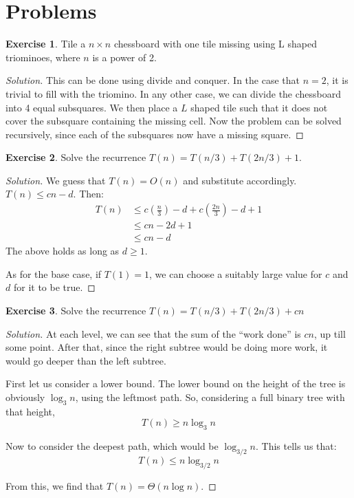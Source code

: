 \documentclass[12pt,letterpaper]{article}
\theoremstyle{definition}
\newtheorem*{exercise}{Exercise}
\newenvironment{solution}
  {\renewcommand\qedsymbol{$\blacksquare$}\begin{proof}[Solution]}
  {\end{proof}}
\begin{document}
\section{Problems}

\begin{exercise}
  Tile a $n \times n$ chessboard with one tile missing using L shaped triominoes, where $n$ is a power of 2.
\end{exercise}
\begin{solution}
  This can be done using divide and conquer. In the case that $n = 2$, it is trivial to fill with the triomino.
  In any other case, we can divide the chessboard into 4 equal subsquares. We then place a $L$ shaped tile such that it does not cover the subsquare containing the missing cell. Now the problem can be solved recursively, since each of the subsquares now have a missing square.
\end{solution}

\begin{exercise}
  Solve the recurrence $T(n) = T(n/3) + T(2n/3) + 1$.
\end{exercise}
\begin{solution}
  We guess that $T(n) = O(n)$ and substitute accordingly. $T(n) \leq cn-d$. Then:
  \begin{align*}
    T(n) & \leq c(\frac{n}{3}) - d + c(\frac{2n}{3})  - d + 1 \\
         &\leq cn -2d + 1 \\
         &\leq cn-d
  \end{align*}
  The above holds as long as $d \geq 1$.

  As for the base case, if $T(1) = 1$, we can choose a suitably large value for $c$ and $d$ for it to be true.
\end{solution}

\begin{exercise}
  Solve the recurrence $T(n) = T(n/3) + T(2n/3) + cn$
\end{exercise}
\begin{solution}
  At each level, we can see that the sum of the ``work done''  is $cn$, up till some point. After that, since the right subtree would be doing more work, it would go deeper than the left subtree.

  First let us consider a lower bound. The lower bound on the height of the tree is obviously $\log_3n$, using the leftmost path. So, considering a full binary tree with that height,
  \[T(n) \geq n \log_3n\]

  Now to consider the deepest path, which would be $\log_{3/2}n$. This tells us that:
  \[T(n) \leq n \log_{3/2}n\]

  From this, we find that $T(n) = \Theta(n \log n)$.
\end{solution}
\end{document}
